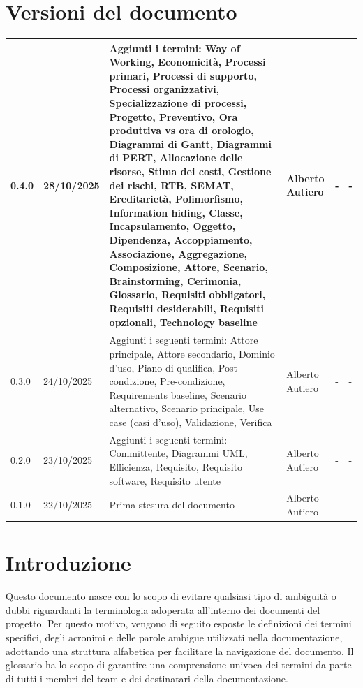 \documentclass[a4paper,11pt]{article}
\begin{document}
\newpage

\tableofcontents

\newpage

\section*{Versioni del documento}

{\footnotesize
\begin{tabular}{|p{1.5cm}|p{1.8cm}|p{4cm}|p{2cm}|p{2cm}|p{2cm}|}
\hline
0.4.0 & 28/10/2025 & Aggiunti i termini: Way of Working, Economicità, Processi primari, Processi di supporto, Processi organizzativi, Specializzazione di processi, Progetto, Preventivo, Ora produttiva vs ora di orologio, Diagrammi di Gantt, Diagrammi di PERT, Allocazione delle risorse, Stima dei costi, Gestione dei rischi, RTB, SEMAT, Ereditarietà, Polimorfismo, Information hiding, Classe, Incapsulamento, Oggetto, Dipendenza, Accoppiamento, Associazione, Aggregazione, Composizione, Attore, Scenario, Brainstorming, Cerimonia, Glossario, Requisiti obbligatori, Requisiti desiderabili, Requisiti opzionali, Technology baseline & Alberto Autiero & - & - \\
\hline
0.3.0 & 24/10/2025 & Aggiunti i seguenti termini: Attore principale, Attore secondario, Dominio d'uso, Piano di qualifica, Post-condizione, Pre-condizione, Requirements baseline, Scenario alternativo, Scenario principale, Use case (casi d'uso), Validazione, Verifica & Alberto Autiero & - & - \\
\hline
0.2.0 & 23/10/2025 & Aggiunti i seguenti termini: Committente, Diagrammi UML, Efficienza, Requisito, Requisito software, Requisito utente & Alberto Autiero & - & - \\
\hline
0.1.0 & 22/10/2025 & Prima stesura del documento & Alberto Autiero & - & - \\
\hline
\end{tabular}
}

\newpage

\section{Introduzione}
Questo documento nasce con lo scopo di evitare qualsiasi tipo di ambiguità o dubbi riguardanti la terminologia adoperata all'interno dei documenti del progetto. Per questo motivo, vengono di seguito esposte le definizioni dei termini specifici, degli acronimi e delle parole ambigue utilizzati nella documentazione, adottando una struttura alfabetica per facilitare la navigazione del documento. Il glossario ha lo scopo di garantire una comprensione univoca dei termini da parte di tutti i membri del team e dei destinatari della documentazione.
\end{document}
